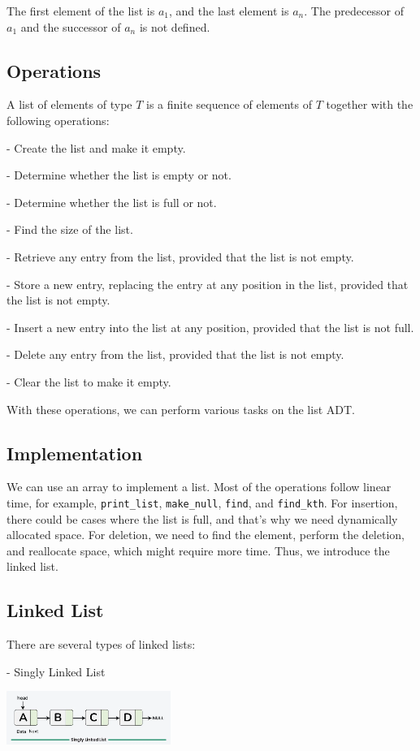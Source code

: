 The first element of the list is \(a_1\), and the last element is \(a_n\). The predecessor of \(a_1\) and the successor of \(a_n\) is not defined. 

\subsection{Operations}
A list of elements of type \(T\) is a finite sequence of elements of \(T\) together with the following operations:

- Create the list and make it empty.

- Determine whether the list is empty or not.

- Determine whether the list is full or not.

- Find the size of the list.

- Retrieve any entry from the list, provided that the list is not empty.

- Store a new entry, replacing the entry at any position in the list, provided that the list is not empty.

- Insert a new entry into the list at any position, provided that the list is not full.

- Delete any entry from the list, provided that the list is not empty.

- Clear the list to make it empty.

With these operations, we can perform various tasks on the list ADT.

\subsection{Implementation}
We can use an array to implement a list. Most of the operations follow linear time, for example, \verb|print_list|, \verb|make_null|, \verb|find|, and \verb|find_kth|. For insertion, there could be cases where the list is full, and that's why we need dynamically allocated space. For deletion, we need to find the element, perform the deletion, and reallocate space, which might require more time. Thus, we introduce the linked list.

\subsection{Linked List}
There are several types of linked lists:

- Singly Linked List  
{\par\centering
\includegraphics[width=0.4\textwidth]{Figure/singly-linked-list.png}
\par}

